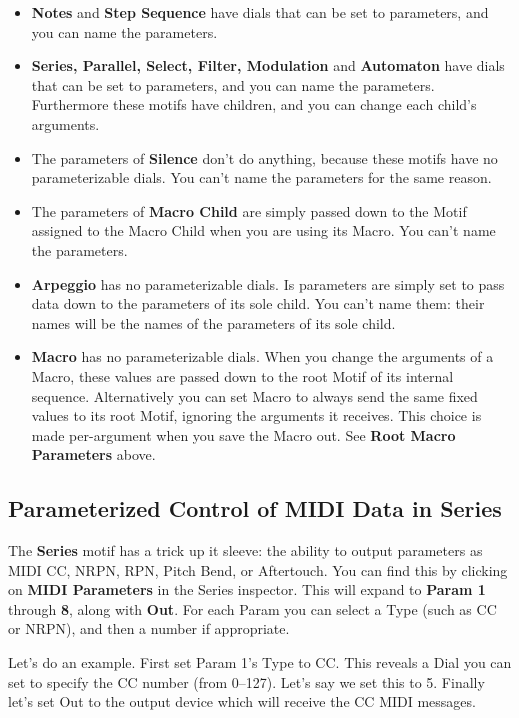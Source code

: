 \documentclass[twoside,10pt]{article}
\begin{document}
\begin{itemize}
\item {\bf Notes} and {\bf Step Sequence} have dials that can be set to parameters, and you can name the parameters.
\item {\bf Series, Parallel, Select, Filter, Modulation} and {\bf Automaton} have dials that can be set to parameters, and you can name the parameters.  Furthermore these motifs have children, and you can change each child's arguments.
\item The parameters of {\bf Silence} don't do anything, because these motifs have no parameterizable dials.    You can't name the parameters for the same reason.
\item The parameters of {\bf Macro Child} are simply passed down to the Motif assigned to the Macro Child when you are using its Macro.  You can't name the parameters.
\item {\bf Arpeggio} has no parameterizable dials.   Is parameters are simply set to pass data down to the parameters of its sole child.  You can't name them: their names will be the names of the parameters of its sole child.
\item {\bf Macro} has no parameterizable dials.  When you change the arguments of a Macro, these values are passed down to the root Motif of its internal sequence.  Alternatively you can set Macro to always send the same fixed values to its root Motif, ignoring the arguments it receives.  This choice is made per-argument when you save the Macro out.  See {\bf Root Macro Parameters} above.
\end{itemize}

\subsection{Parameterized Control of MIDI Data in Series}
\label{mididata}

The {\bf Series} motif has a trick up it sleeve: the ability to output parameters as MIDI CC, NRPN, RPN, Pitch Bend, or Aftertouch. You can find this by clicking on {\bf MIDI Parameters} in the Series inspector.  This will expand to {\bf Param 1} through {\bf 8}, along with {\bf Out}.  For each Param you can select a Type (such as CC or NRPN), and then a number if appropriate.  

Let's do an example.  First set Param 1's Type to CC.  This reveals a Dial you can set to specify the CC number (from 0--127).  Let's say we set this to 5.  Finally let's set Out to the output device which will receive the CC MIDI messages.
\end{document}
